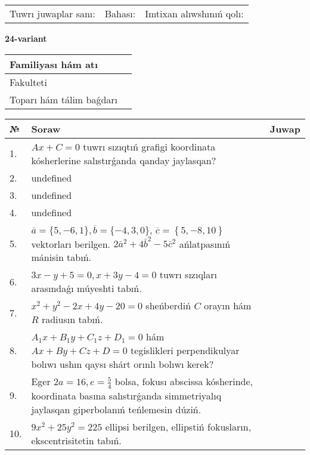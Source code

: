 \documentclass{article}
\begin{document}
\vspace{0.7cm}

\begin{tabular}{lll}
Tuwrı juwaplar sanı: \underline{\hspace{1cm}} & 
Bahası: \underline{\hspace{1cm}} & 
Imtixan alıwshınıń qolı: \underline{\hspace{2cm}} \\
\end{tabular}

\egroup

\newpage


\textbf{24-variant}\\

\bgroup
\def\arraystretch{1.6} %

\begin{tabular}{|m{5.7cm}|m{9.5cm}|}
\hline
Familiyası hám atı & \\
\hline
Fakulteti  & \\
\hline
Toparı hám tálim baǵdarı  & \\
\hline
\end{tabular}

\vspace{0.7cm}

\begin{tabular}{|m{0.7cm}|m{10cm}|m{4cm}|}
\hline
№ & Soraw & Juwap \\
\hline
1. & \(Ax + C = 0\) tuwrı sızıqtıń grafigi koordinata kósherlerine salıstırǵanda qanday jaylasqan? &  \\
\hline
2. & undefined &  \\
\hline
3. & undefined &  \\
\hline
4. & undefined &  \\
\hline
5. & \(\overline{a} = \{5,- 6, 1 \}, \overline{b} = \{ - 4, 3, 0 \} \), \(\overline{c} = \left\{ 5,- 8, 10 \right\}\) vektorları berilgen. \(2{\bar{a}}^{2} + 4{\bar{b}}^{2} - 5{\bar{c}}^{2}\) ańlatpasınıń mánisin tabıń. &  \\
\hline
6. & \(3 x - y + 5 = 0, x + 3 y - 4 = 0\) tuwrı sızıqları arasındaǵı múyeshti tabıń. &  \\
\hline
7. & \(x^{2} + y^{2} - 2 x + 4 y - 20 = 0\) sheńberdiń \(C\) orayın hám \(R\) radiusın tabıń. &  \\
\hline
8. & \(A_{1}x + B_{1}y + C_{1}z + D_{1} = 0\) hám \(Ax + By + Cz + D = 0\) tegislikleri perpendikulyar bolıwı ushın qaysı shárt orınlı bolıwı kerek? &  \\
\hline
9. & Eger \(2 a = 16, e = \frac{5}{4}\) bolsa, fokusı abscissa kósherinde, koordinata basına salıstırǵanda simmetriyalıq jaylasqan giperbolanıń teńlemesin dúziń. &  \\
\hline
10. & \(9 x^{2} + 25 y^{2} = 225\) ellipsi berilgen, ellipstiń fokusların, ekscentrisitetin tabıń. & \\
\hline
\end{tabular}
\end{document}

